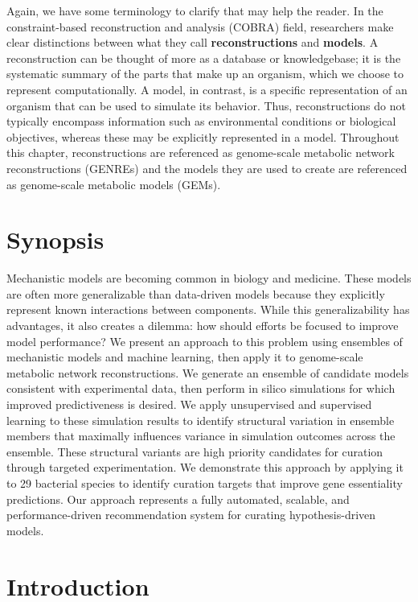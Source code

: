 \documentclass[11pt,twocolumn,notitlepage,openany,twoside]{book}
\begin{document}
\begin{refsection}
Again, we have some terminology to clarify that may help the reader. In the constraint-based reconstruction and analysis (COBRA) field, researchers make clear distinctions between what they call \textbf{reconstructions} and \textbf{models}. A reconstruction can be thought of more as a database or knowledgebase; it is the systematic summary of the parts that make up an organism, which we choose to represent computationally. A model, in contrast, is a specific representation of an organism that can be used to simulate its behavior. Thus, reconstructions do not typically encompass information such as environmental conditions or biological objectives, whereas these may be explicitly represented in a model. Throughout this chapter, reconstructions are referenced as genome-scale metabolic network reconstructions (GENREs) and the models they are used to create are referenced as genome-scale metabolic models (GEMs).

\section{Synopsis}
Mechanistic models are becoming common in biology and medicine. These models are often more generalizable than data-driven models because they explicitly represent known interactions between components. While this generalizability has advantages, it also creates a dilemma: how should efforts be focused to improve model performance? We present an approach to this problem using ensembles of mechanistic models and machine learning, then apply it to genome-scale metabolic network reconstructions. We generate an ensemble of candidate models consistent with experimental data, then perform in silico simulations for which improved predictiveness is desired. We apply unsupervised and supervised learning to these simulation results to identify structural variation in ensemble members that maximally influences variance in simulation outcomes across the ensemble. These structural variants are high priority candidates for curation through targeted experimentation. We demonstrate this approach by applying it to 29 bacterial species to identify curation targets that improve gene essentiality predictions. Our approach represents a fully automated, scalable, and performance-driven recommendation system for curating hypothesis-driven models.

\section{Introduction}


\end{refsection}
\end{document}
